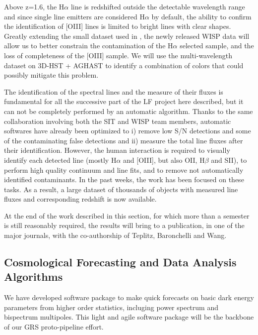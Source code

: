 Above z=1.6, the H$\alpha$ line is redshifted outside the detectable wavelength
range and since single line emitters are considered H$\alpha$ by default, the
ability to confirm the identification of [OIII] lines is limited to bright lines
with clear shapes. Greatly extending the small dataset used in
\citet{Colbert:2013ita}, the newly released WISP data will allow us to better
constrain the contamination of the H$\alpha$ selected sample, and the loss of
completeness of the [OIII] sample. We will use the multi-wavelength dataset on
3D-HST + AGHAST to identify a combination of colors that could possibly mitigate
this problem.

The identification of the spectral lines and the measure of their fluxes is
fundamental for all the successive part of the LF project here described, but it
can not be completely performed by an automatic algorithm. Thanks to the same
collaboration involving both the SIT and WISP team members, automatic softwares
have already been optimized to i) remove low S/N detections and some of the
contaminating false detections and ii) measure the total line fluxes after their
identification. However, the human interaction is required to visually identify
each detected line (mostly H$\alpha$ and [OIII], but also OII, H$\beta$ and
SII), to perform high quality continuum and line fits, and to remove not
automatically identified contaminants. In the past weeks, the work has been
focused on these tasks. As a result, a large dataset of thousands of objects
with measured line fluxes and corresponding redshift is now available.

At the end of the work described in this section, for which more than a semester is still reasonably required, the results will bring to a publication, in one of the major journals, with the co-authorship of Teplitz, Baronchelli and Wang.


 \subsection{Cosmological Forecasting and Data Analysis Algorithms}

 \begin{summaryii}
  We have developed software package to make quick forecasts on basic dark energy parameters from higher order statistics, incluging power spectrum and bispectrum multipoles. This light and agile software package will be the backbone of our GRS proto-pipeline effort.
  \end{summaryii}


